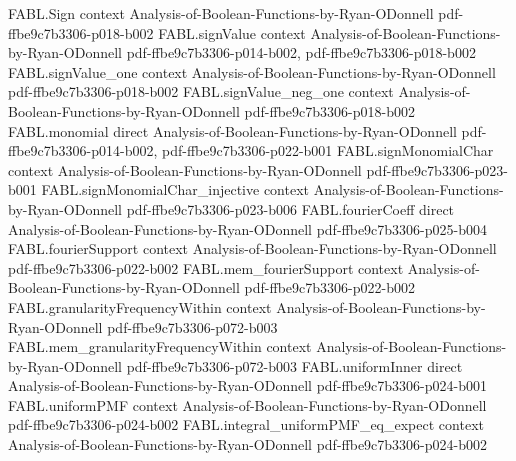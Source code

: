 \begin{theorem}
\label{FABL.FiniteFourierBasis.productInfluence_eq_sum_sq_fourierCoeff}
\leanok
{}
\proofstep
  {FABL.Sign}
  {context}
  {Analysis-of-Boolean-Functions-by-Ryan-ODonnell}
  {pdf-ffbe9c7b3306-p018-b002}
\proofstep
  {FABL.signValue}
  {context}
  {Analysis-of-Boolean-Functions-by-Ryan-ODonnell}
  {pdf-ffbe9c7b3306-p014-b002,
    pdf-ffbe9c7b3306-p018-b002}
\proofstep
  {FABL.signValue_one}
  {context}
  {Analysis-of-Boolean-Functions-by-Ryan-ODonnell}
  {pdf-ffbe9c7b3306-p018-b002}
\proofstep
  {FABL.signValue_neg_one}
  {context}
  {Analysis-of-Boolean-Functions-by-Ryan-ODonnell}
  {pdf-ffbe9c7b3306-p018-b002}
\proofstep
  {FABL.monomial}
  {direct}
  {Analysis-of-Boolean-Functions-by-Ryan-ODonnell}
  {pdf-ffbe9c7b3306-p014-b002,
    pdf-ffbe9c7b3306-p022-b001}
\proofstep
  {FABL.signMonomialChar}
  {context}
  {Analysis-of-Boolean-Functions-by-Ryan-ODonnell}
  {pdf-ffbe9c7b3306-p023-b001}
\proofstep
  {FABL.signMonomialChar_injective}
  {context}
  {Analysis-of-Boolean-Functions-by-Ryan-ODonnell}
  {pdf-ffbe9c7b3306-p023-b006}
\proofstep
  {FABL.fourierCoeff}
  {direct}
  {Analysis-of-Boolean-Functions-by-Ryan-ODonnell}
  {pdf-ffbe9c7b3306-p025-b004}
\proofstep
  {FABL.fourierSupport}
  {context}
  {Analysis-of-Boolean-Functions-by-Ryan-ODonnell}
  {pdf-ffbe9c7b3306-p022-b002}
\proofstep
  {FABL.mem_fourierSupport}
  {context}
  {Analysis-of-Boolean-Functions-by-Ryan-ODonnell}
  {pdf-ffbe9c7b3306-p022-b002}
\proofstep
  {FABL.granularityFrequencyWithin}
  {context}
  {Analysis-of-Boolean-Functions-by-Ryan-ODonnell}
  {pdf-ffbe9c7b3306-p072-b003}
\proofstep
  {FABL.mem_granularityFrequencyWithin}
  {context}
  {Analysis-of-Boolean-Functions-by-Ryan-ODonnell}
  {pdf-ffbe9c7b3306-p072-b003}
\proofstep
  {FABL.uniformInner}
  {direct}
  {Analysis-of-Boolean-Functions-by-Ryan-ODonnell}
  {pdf-ffbe9c7b3306-p024-b001}
\proofstep
  {FABL.uniformPMF}
  {context}
  {Analysis-of-Boolean-Functions-by-Ryan-ODonnell}
  {pdf-ffbe9c7b3306-p024-b002}
\proofstep
  {FABL.integral_uniformPMF_eq_expect}
  {context}
  {Analysis-of-Boolean-Functions-by-Ryan-ODonnell}
  {pdf-ffbe9c7b3306-p024-b002}

\end{theorem}
